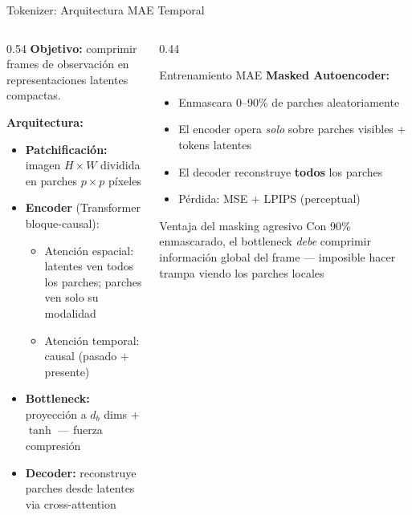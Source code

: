 \documentclass[aspectratio=169, 12pt]{beamer}
\begin{document}
\begin{frame}{Tokenizer: Arquitectura MAE Temporal}
\begin{columns}[T]
  \begin{column}{0.54\textwidth}
    \textbf{Objetivo:} comprimir frames de observación en representaciones latentes compactas.

    \vspace{8pt}
    \textbf{Arquitectura:}
    \begin{itemize}
      \item \textbf{Patchificación:} imagen $H{\times}W$ dividida en parches $p{\times}p$ píxeles
      \item \textbf{Encoder} (Transformer bloque-causal):
            \begin{itemize}\small
              \item Atención espacial: latentes ven todos los parches; parches ven solo su modalidad
              \item Atención temporal: causal (pasado + presente)
            \end{itemize}
      \item \textbf{Bottleneck:} proyección a $d_b$ dims + $\tanh$ — fuerza compresión
      \item \textbf{Decoder:} reconstruye parches desde latentes via cross-attention
    \end{itemize}
  \end{column}
  \begin{column}{0.44\textwidth}
    \begin{block}{Entrenamiento MAE}
      \textbf{Masked Autoencoder:}
      \begin{itemize}
        \item Enmascara 0--90\% de parches aleatoriamente
        \item El encoder opera \emph{solo} sobre parches visibles + tokens latentes
        \item El decoder reconstruye \textbf{todos} los parches
        \item Pérdida: MSE + LPIPS (perceptual)
      \end{itemize}
    \end{block}
    \vspace{6pt}
    \begin{exampleblock}{Ventaja del masking agresivo}
      Con 90\% enmascarado, el bottleneck \emph{debe} comprimir información global del frame — imposible hacer trampa viendo los parches locales
    \end{exampleblock}
  \end{column}
\end{columns}
\end{frame}
\end{document}
